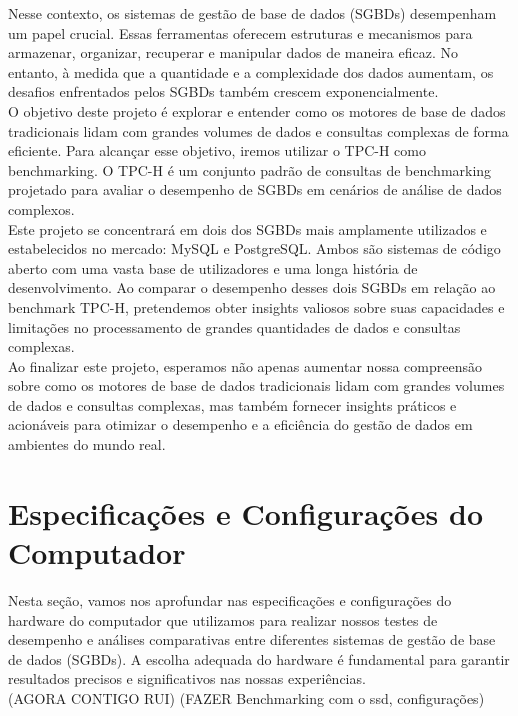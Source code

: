 \documentclass{article}
\begin{document}
\quad Nesse contexto, os sistemas de gestão de base de dados (SGBDs) desempenham um papel crucial. Essas ferramentas oferecem estruturas e mecanismos para armazenar, organizar, recuperar e manipular dados de maneira eficaz. No entanto, à medida que a quantidade e a complexidade dos dados aumentam, os desafios enfrentados pelos SGBDs também crescem exponencialmente.\\

\quad O objetivo deste projeto é explorar e entender como os motores de base de dados tradicionais lidam com grandes volumes de dados e consultas complexas de forma eficiente. Para alcançar esse objetivo, iremos utilizar o TPC-H como benchmarking. O TPC-H é um conjunto padrão de consultas de benchmarking projetado para avaliar o desempenho de SGBDs em cenários de análise de dados complexos.\\

\quad Este projeto se concentrará em dois dos SGBDs mais amplamente utilizados e estabelecidos no mercado: MySQL e PostgreSQL. Ambos são sistemas de código aberto com uma vasta base de utilizadores e uma longa história de desenvolvimento. Ao comparar o desempenho desses dois SGBDs em relação ao benchmark TPC-H, pretendemos obter insights valiosos sobre suas capacidades e limitações no processamento de grandes quantidades de dados e consultas complexas.\\

\quad Ao finalizar este projeto, esperamos não apenas aumentar nossa compreensão sobre como os motores de base de dados tradicionais lidam com grandes volumes de dados e consultas complexas, mas também fornecer insights práticos e acionáveis para otimizar o desempenho e a eficiência do gestão de dados em ambientes do mundo real.\\
\clearpage


\section{Especificações e Configurações do Computador}

\quad Nesta seção, vamos nos aprofundar nas especificações e configurações do hardware do computador que utilizamos para realizar nossos testes de desempenho e análises comparativas entre diferentes sistemas de gestão de base de dados (SGBDs). A escolha adequada do hardware é fundamental para garantir resultados precisos e significativos nas nossas experiências.\\

(AGORA CONTIGO RUI) (FAZER Benchmarking com o ssd, configurações)
\end{document}
